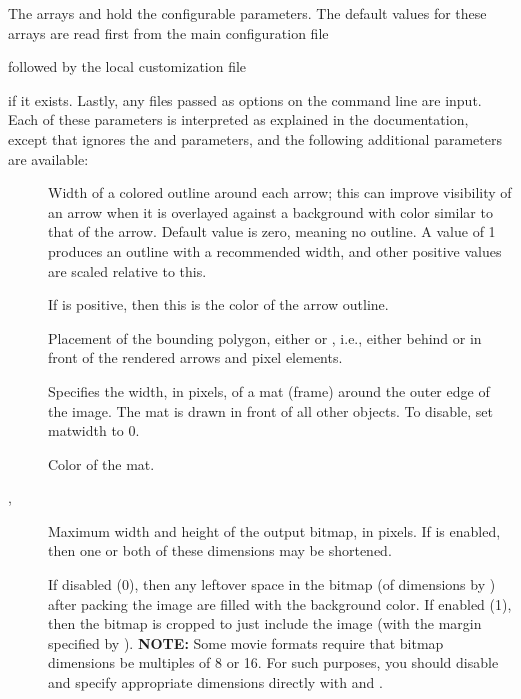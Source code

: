 The arrays  and  hold the
configurable parameters.  The default values for these arrays are read
first from the main configuration file
\begin{quote}
\end{quote}
followed by the local customization file
\begin{quote}
\end{quote}
if it exists.  Lastly, any files passed as  options on the
command line are input.  Each of these parameters is interpreted as
explained in the 
documentation, except that  ignores the
 and 
parameters, and the following additional parameters are available:
\begin{description}
\item[]
 Width of a colored outline around each arrow; this can improve
 visibility of an arrow when it is overlayed against a background with
 color similar to that of the arrow.  Default value is zero, meaning no
 outline.  A value of 1 produces an outline with a recommended width,
 and other positive values are scaled relative to this.
\item[]
 If  is positive, then this is the color of the
 arrow outline.
\item[]
 Placement of the bounding polygon, either  or ,
 i.e., either behind or in front of the rendered arrows and pixel
 elements.
\item[]
 Specifies the width, in pixels, of a mat (frame) around the outer edge
 of the image.  The mat is drawn in front of all other objects.  To
 disable, set matwidth to 0.
\item[]
 Color of the mat.
\item[, ]
 Maximum width and height of the output bitmap, in pixels.  If
  is enabled, then one or both of these dimensions may be
 shortened.
\item[]
 If disabled (0), then any leftover space in the bitmap (of dimensions
  by ) after packing the image are filled
 with the background color.  If enabled (1), then the bitmap is cropped
 to just include the image (with the margin specified by
 ).  {\bf NOTE:} Some movie formats require that
 bitmap dimensions be multiples of 8 or 16.  For such purposes, you
 should disable  and specify appropriate dimensions
 directly with  and .
\end{description}

